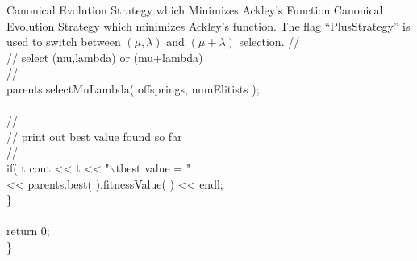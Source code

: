 \begin{programlisting}{Canonical Evolution Strategy which Minimizes Ackley's Function}{
    Canonical Evolution Strategy which minimizes Ackley's function.
    The flag ``PlusStrategy'' is used to switch between $(\mu,\lambda)$
    and $(\mu+\lambda)$ selection.}
        //\\
        // select (mu,lambda) or (mu+lambda)\\
        //\\
        parents.selectMuLambda( offsprings, numElitists );\\
\\
        //\\
        // print out best value found so far\\
        //\\
        if( t %
            cout << t << "$\backslash$tbest value = "\\
                 << parents.best( ).fitnessValue( ) << endl;\\
    \}\\
\\
    return 0;\\
\}\\
\end{programlisting}

